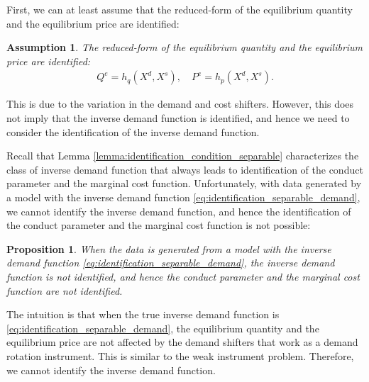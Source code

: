 \documentclass[11pt, a4paper]{article}
\newtheorem{assumption}{Assumption}
\newtheorem{proposition}{Proposition}
\theoremstyle{remark}
\begin{document}
First, we can at least assume that the reduced-form of the equilibrium quantity and the equilibrium price are identified:
\begin{assumption}
    The reduced-form of the equilibrium quantity and the equilibrium price are identified:
    \begin{align}
        Q^e = h_q(X^{d}, X^{s}), \quad P^e = h_p(X^{d}, X^{s}).
    \end{align}
\end{assumption}
This is due to the variation in the demand and cost shifters.
However, this does not imply that the inverse demand function is identified, and hence we need to consider the identification of the inverse demand function.

Recall that Lemma \ref{lemma:identification_condition_separable} characterizes the class of inverse demand function that always leads to identification of the conduct parameter and the marginal cost function.
Unfortunately, with data generated by a model with the inverse demand function \eqref{eq:identification_separable_demand}, we cannot identify the inverse demand function, and hence the identification of the conduct parameter and the marginal cost function is not possible:
\begin{proposition}
    When the data is generated from a model with the inverse demand function \eqref{eq:identification_separable_demand}, the inverse demand function is not identified, and hence the conduct parameter and the marginal cost function are not identified.
\end{proposition}
The intuition is that when the true inverse demand function is \eqref{eq:identification_separable_demand}, the equilibrium quantity and the equilibrium price are not affected by the demand shifters that work as a demand rotation instrument.
This is similar to the weak instrument problem.
Therefore, we cannot identify the inverse demand function.










\end{document}
